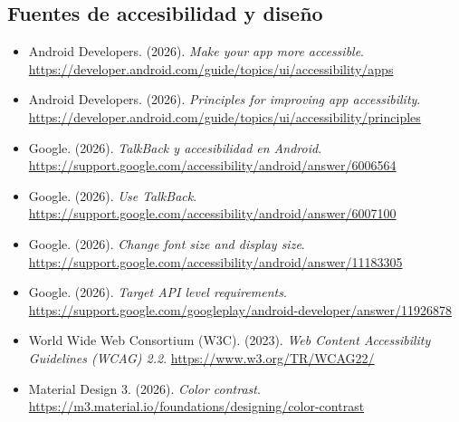 \documentclass[11pt,a4paper]{article}
\begin{document}
	\subsection*{Fuentes de accesibilidad y diseño}
	{\footnotesize
		\begin{itemize}[leftmargin=*,itemsep=0.02em,topsep=0.1em,label={}]
			\item Android Developers. (2026). \emph{Make your app more accessible}. \url{https://developer.android.com/guide/topics/ui/accessibility/apps}
			\item Android Developers. (2026). \emph{Principles for improving app accessibility}. \url{https://developer.android.com/guide/topics/ui/accessibility/principles}
			\item Google. (2026). \emph{TalkBack y accesibilidad en Android}. \url{https://support.google.com/accessibility/android/answer/6006564}
			\item Google. (2026). \emph{Use TalkBack}. \url{https://support.google.com/accessibility/android/answer/6007100}
			\item Google. (2026). \emph{Change font size and display size}. \url{https://support.google.com/accessibility/android/answer/11183305}
			\item Google. (2026). \emph{Target API level requirements}. \url{https://support.google.com/googleplay/android-developer/answer/11926878}
		\end{itemize}
	}
	
	
	{\footnotesize
		\begin{itemize}[leftmargin=*,itemsep=0.02em,topsep=0.1em,label={}]
			\item World Wide Web Consortium (W3C). (2023). \emph{Web Content Accessibility Guidelines (WCAG) 2.2}. \url{https://www.w3.org/TR/WCAG22/}
			\item Material Design 3. (2026). \emph{Color contrast}. \url{https://m3.material.io/foundations/designing/color-contrast}
		\end{itemize}
	}
	
\end{document}
